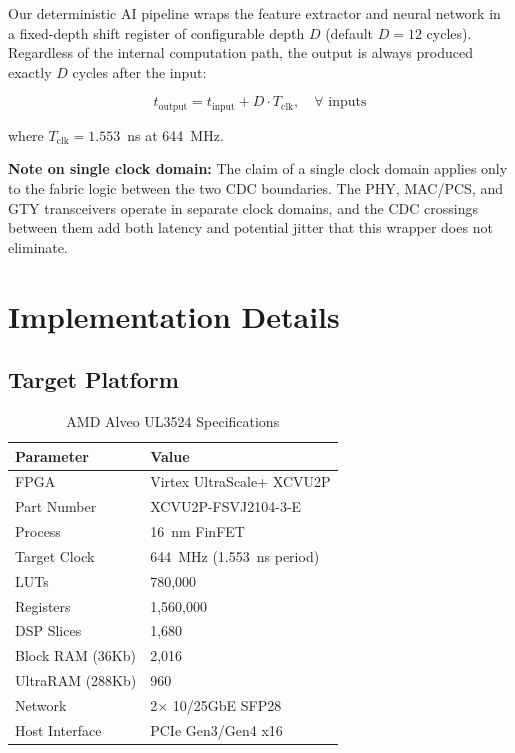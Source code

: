 \documentclass[conference,10pt]{IEEEtran}
\begin{document}
Our deterministic AI pipeline wraps the feature extractor and neural network in a fixed-depth shift register of configurable depth $D$ (default $D = 12$ cycles). Regardless of the internal computation path, the output is always produced exactly $D$ cycles after the input:

\begin{equation}
t_{\text{output}} = t_{\text{input}} + D \cdot T_{\text{clk}}, \quad \forall \text{ inputs}
\end{equation}

\noindent where $T_{\text{clk}} = 1.553$~ns at 644~MHz.

\textbf{Note on single clock domain:} The claim of a single clock domain applies only to the fabric logic between the two CDC boundaries. The PHY, MAC/PCS, and GTY transceivers operate in separate clock domains, and the CDC crossings between them add both latency and potential jitter that this wrapper does not eliminate.

\section{Implementation Details}
\label{sec:impl}

\subsection{Target Platform}

\begin{table}[h]
\centering
\caption{AMD Alveo UL3524 Specifications}
\label{tab:platform}
\begin{tabular}{@{}ll@{}}
\toprule
Parameter & Value \\
\midrule
FPGA & Virtex UltraScale+ XCVU2P \\
Part Number & XCVU2P-FSVJ2104-3-E \\
Process & 16~nm FinFET \\
Target Clock & 644~MHz (1.553~ns period) \\
LUTs & 780,000 \\
Registers & 1,560,000 \\
DSP Slices & 1,680 \\
Block RAM (36Kb) & 2,016 \\
UltraRAM (288Kb) & 960 \\
Network & 2$\times$ 10/25GbE SFP28 \\
Host Interface & PCIe Gen3/Gen4 x16 \\
\bottomrule
\end{tabular}
\end{table}
\end{document}
